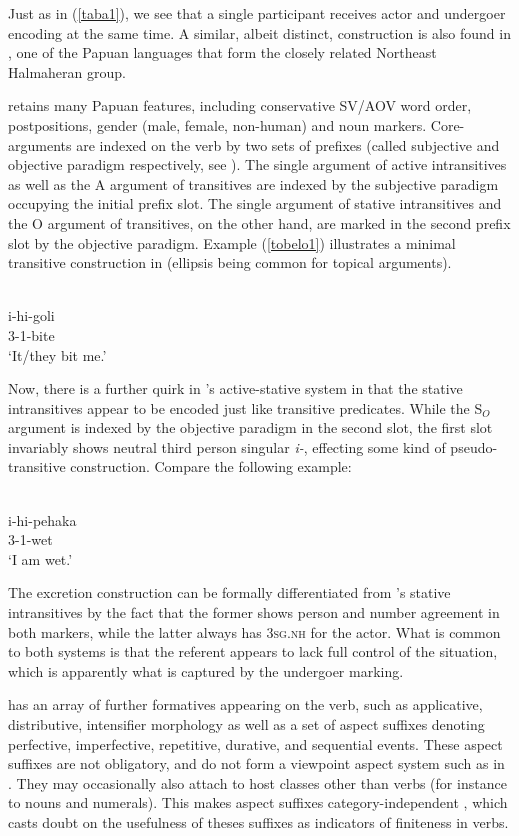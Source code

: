 Just as in (\ref{taba1}), we see that a single participant receives actor and undergoer encoding at the same time. A similar, albeit distinct, construction is also found in , one of the Papuan languages that form the closely related Northeast Halmaheran group.

 retains many Papuan features, including conservative SV/AOV word order, postpositions, gender (male, female, non-human) and noun markers. Core-arguments are indexed on the verb by two sets of prefixes (called subjective and objective paradigm respectively, see \citealt[38]{holton2003tobelo}). The single argument of active intransitives as well as the A argument of transitives are indexed by the subjective paradigm occupying the initial prefix slot. The single argument of stative intransitives and the O argument of transitives, on the other hand, are marked in the second prefix slot by the objective paradigm. Example (\ref{tobelo1}) illustrates a minimal transitive construction in  (ellipsis being common for topical arguments).

\ea \label{tobelo1}
\\
\gll i-hi-goli \\
3-1-bite \\
\glft `It/they bit me.' 
\z

Now, there is a further quirk in 's active-stative system in that the stative intransitives appear to be encoded just like transitive predicates. While the S$_O$ argument is indexed by the objective paradigm in the second slot, the first slot invariably shows neutral third person singular \textit{i-}, effecting some kind of pseudo-transitive construction. Compare the following example:

\ea 
{}\\
\gll i-hi-pehaka \\
3-1-wet \\
\glft `I am wet.'
\z

The  excretion construction can be formally differentiated from 's stative intransitives by the fact that the former shows person and number agreement in both markers, while the latter always has \textsc{3sg.nh} for the actor. What is common to both systems is that the referent appears to lack full control of the situation, which is apparently what is captured by the undergoer marking.

 has an array of further formatives appearing on the verb, such as applicative, distributive, intensifier morphology as well as a set of aspect suffixes denoting perfective, imperfective, repetitive, durative, and sequential events. These aspect suffixes are not obligatory, and do not form a viewpoint aspect system such as in . They may occasionally also attach to host classes other than verbs (for instance to nouns and numerals). This makes  aspect suffixes category-independent \citep[44]{holton2003tobelo}, which casts doubt on the usefulness of theses suffixes as indicators of finiteness in verbs. 

